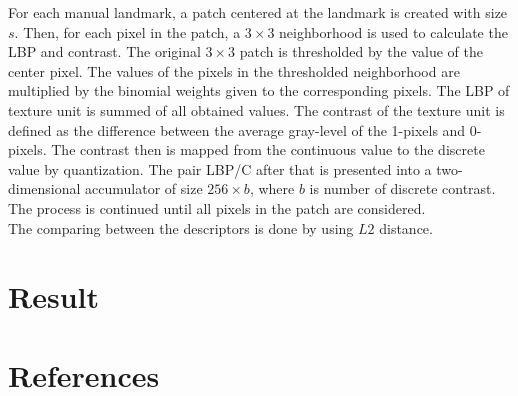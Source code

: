 \documentclass[12pt,a4paper]{article}
\begin{document}
For each manual landmark, a patch centered at the landmark is created  with size $s$. Then, for each pixel in the patch, a $3 \times 3$ neighborhood is used to calculate the LBP and contrast. The original $3 \times 3$ patch is thresholded by the value of the center pixel. The values of the pixels in the thresholded neighborhood are multiplied by the binomial weights given to the corresponding pixels. The LBP of texture unit is summed of all obtained values. The contrast of the texture unit is defined as the difference between the average gray-level of the 1-pixels and 0-pixels. The contrast then is mapped from the continuous value to the discrete value by quantization. The pair LBP/C after that is presented into a two-dimensional accumulator of size $256 \times b$, where $b$ is number of discrete contrast. The process is continued until all pixels in the patch are considered.\\
The comparing between the descriptors is done by using $L2$ distance.
\section{Result}
\section{References}


\end{document}
